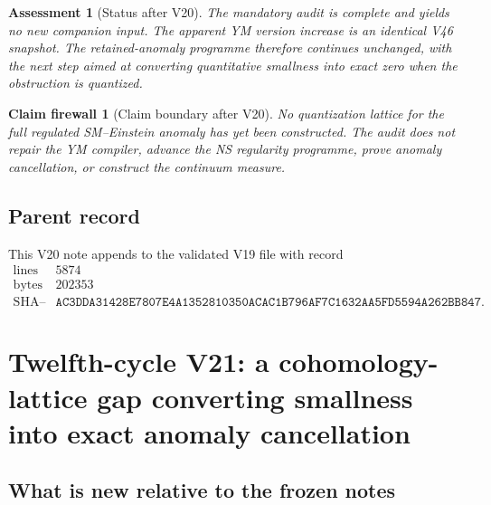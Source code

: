 \documentclass[11pt]{article}
\newtheorem{firewall}[theorem]{Claim firewall}
\newtheorem{assessment}[theorem]{Assessment}
\theoremstyle{remark}
\begin{document}
\begin{assessment}[Status after V20]
\label{ass:v12v20-status}
The mandatory audit is complete and yields no new companion input.
The apparent YM version increase is an identical V46 snapshot.
The retained-anomaly programme therefore continues unchanged, with
the next step aimed at converting quantitative smallness into exact
zero when the obstruction is quantized.
\end{assessment}

\begin{firewall}[Claim boundary after V20]
\label{fire:v12v20-claim}
No quantization lattice for the full regulated SM--Einstein anomaly
has yet been constructed.  The audit does not repair the YM compiler,
advance the NS regularity programme, prove anomaly cancellation, or
construct the continuum measure.
\end{firewall}

\subsection{Parent record}

This V20 note appends to the validated V19 file with record
\[
\begin{array}{c|c}
\text{lines}&5874\\
\text{bytes}&202353\\
\text{SHA--256}&
\texttt{AC3DDA31428E7807E4A1352810350ACAC1B796AF7C1632AA5FD5594A262BB847}.
\end{array}
\]


\section{Twelfth-cycle V21: a cohomology-lattice gap converting
smallness into exact anomaly cancellation}
\label{sec:v12v21}

\subsection{What is new relative to the frozen notes}
\end{document}

